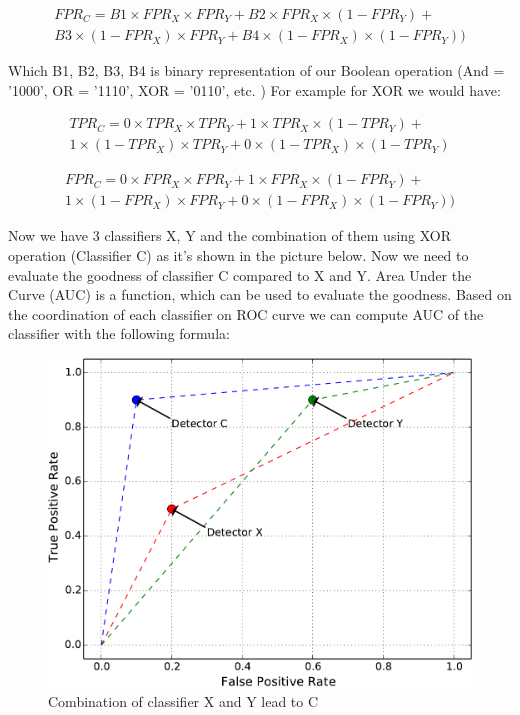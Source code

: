 \begin{multline}
FPR_C = B1 \times FPR_X \times FPR_Y+B2\times FPR_X \times(1- FPR_Y)+\\B3\times(1-FPR_X)\times FPR_Y+B4\times(1- FPR_X)\times(1-FPR_Y))
\end{multline}


Which B1, B2, B3, B4 is binary representation of our Boolean operation (And = '1000', OR = '1110', XOR = '0110', etc. )
For example for XOR we would have:

\begin{multline}
TPR_C = 0 \times TPR_X \times TPR_Y+1\times TPR_X \times(1- TPR_Y)+\\1\times(1- TPR_X)\times TPR_Y+0\times(1- TPR_X)\times(1- TPR_Y)
\end{multline}

\begin{multline}
FPR_C = 0 \times FPR_X \times FPR_Y+1\times FPR_X \times(1- FPR_Y)+\\1\times(1-FPR_X)\times FPR_Y+0\times(1- FPR_X)\times(1-FPR_Y))
\end{multline}

Now we have 3 classifiers X, Y and the combination of them using XOR operation (Classifier C) as it's shown in the picture below. Now we need to evaluate the goodness of classifier C compared to X and Y. Area Under the Curve (AUC) is a function, which can be used to evaluate the goodness. Based on the coordination of each classifier on ROC curve we can compute AUC of the classifier with the following formula:


\begin{figure}[H]
\centering
\includegraphics[scale=0.75]{figs/Classifiers_X_Y_C}
\caption{Combination of classifier X and Y lead to C}
\label{fig::X_Y_C}
\end{figure}


